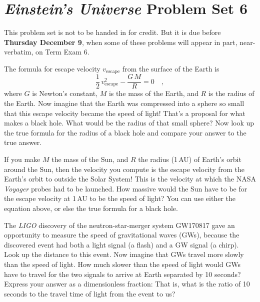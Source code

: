 \documentclass[12pt, letterpaper]{article}
\newcommand{\escape}{\mathrm{escape}}
\begin{document}
\section*{\textsl{Einstein's Universe} Problem Set 6}

This problem set is not to be handed in for credit. But it is due
before \textbf{Thursday December 9}, when some of these problems
will appear in part, near-verbatim, on Term Exam 6.

\begin{problem}
The formula for escape velocity $v_{\escape}$ from the surface of the Earth
is
\begin{equation}
\frac{1}{2}\,v_{\escape}^2 - \frac{G\,M}{R} = 0
\quad,
\end{equation}
where $G$ is Newton's constant, $M$ is the mass of the Earth, and $R$
is the radius of the Earth.
Now imagine that the Earth was compressed into a sphere so small that
this escape velocity became the speed of light! That's a proposal for what
makes a black hole. What would be the radius of that small sphere?
Now look up the true formula for the radius of a black hole and compare
your answer to the true answer.

If you make $M$ the mass of the Sun, and $R$ the radius (1\,AU) of
Earth's orbit around the Sun, then the velocity you compute is the
escape velocity from the Earth's orbit to outside the Solar System!
This is the velocity at which the {\small NASA} \textsl{Voyager} probes had to
be launched.
How massive would the Sun have to be for the escape velocity at 1\,AU
to be the speed of light? You can use either the equation above, or
else the true formula for a black hole.
\end{problem}

\begin{problem}
The \textsl{\small LIGO} discovery of the neutron-star-merger system
{\small GW170817} gave an opportunity to measure the speed of
gravitational waves (GWs), because the discovered event had both a
light signal (a flash) and a GW signal (a chirp).
Look up the distance to this event.
Now imagine that GWs travel more slowly than the speed of light.
How much slower than the speed of light would GWs have to travel for
the two signals to arrive at Earth separated by 10 seconds?
Express your answer as a dimensionless fraction:
That is, what is the ratio of 10 seconds to the travel time of light from
the event to us?
\end{problem}
\end{document}
